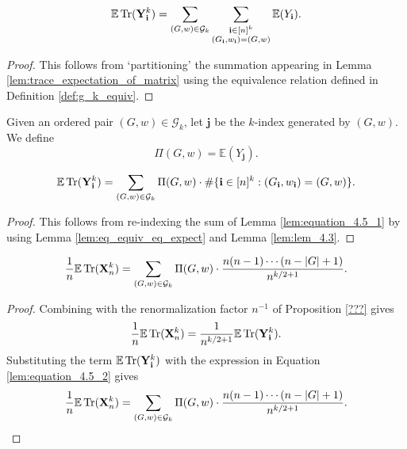 \begin{lemma}
  \label{lem:equation_4.5_1}
  \[
  \mathbb{E} \operatorname{Tr} (\mathbf{Y}_\mathbf{i}^k) = \sum_{(G,w) \in \mathcal{G}_k} \sum_{\substack{\mathbf{i} \in [n]^k \\ (G_\mathbf{i},w_\mathbf{i}) = (G,w)}} \mathbb{E} (Y_\mathbf{i}).
  \]
\end{lemma}
\begin{proof}
  This follows from `partitioning' the summation appearing in Lemma \ref{lem:trace_expectation_of_matrix} using the equivalence relation defined in Definition \ref{def:g_k_equiv}.
\end{proof}
\begin{definition}[$\Pi (G,w)$: R-1-11 : def:Pi.G.w]
  \label{def:Pi.G.w}
  Given an ordered pair $(G,w) \in \mathcal{G}_k$, let $\mathbf{j}$ be the $k$-index generated by $(G,w)$. We define 
  \[
  \Pi (G,w) = \mathbb{E}(Y_\mathbf{j}).
  \]
\end{definition}
\begin{lemma}
  \label{lem:equation_4.5_2}
  \[
  \mathbb{E} \operatorname{Tr} (\mathbf{Y}_\mathbf{i}^k) = \sum_{(G,w) \in \mathcal{G}_k} \Pi (G,w) \cdot \# \{ \mathbf{i} \in [n]^k : (G_\mathbf{i},w_\mathbf{i}) = (G,w) \}.
  \]
\end{lemma}
\begin{proof}
  This follows from re-indexing the sum of Lemma \ref{lem:equation_4.5_1} by using Lemma \ref{lem:eq_equiv_eq_expect} and Lemma \ref{lem:lem_4.3}.
\end{proof}
\begin{lemma}
  \label{lem:equation_4.5_3}
  \[
  \frac{1}{n} \mathbb{E} \operatorname{Tr} (\mathbf{X}_n^k) = \sum_{(G,w) \in \mathcal{G}_k} \Pi (G,w) \cdot \frac{n (n-1) \cdots (n - |G| + 1)}{n^{k/2+1}}.
  \]
\end{lemma}
\begin{proof}
  Combining with the renormalization factor $n^{-1}$ of Proposition \ref{???} gives
  \[
  \frac{1}{n} \mathbb{E} \operatorname{Tr} (\mathbf{X}_n^k) = \frac{1}{n^{k/2+1}} \mathbb{E} \operatorname{Tr} (\mathbf{Y}_\mathbf{i}^k).
  \]
  Substituting the term $\mathbb{E} \operatorname{Tr} (\mathbf{Y}_\mathbf{i}^k)$ with the expression in Equation \ref{lem:equation_4.5_2} gives
  \[
  \frac{1}{n} \mathbb{E} \operatorname{Tr} (\mathbf{X}_n^k) = \sum_{\substack{(G,w) \in \mathcal{G}_k}} \Pi (G,w) \cdot \frac{n (n-1) \cdots (n - |G| + 1)}{n^{k/2+1}}.
  \]
\end{proof}
